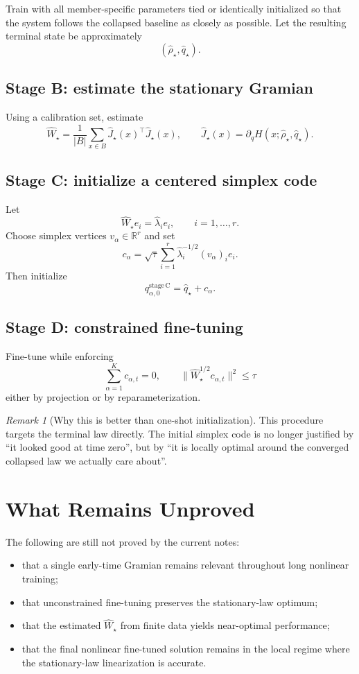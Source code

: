 \documentclass[11pt]{article}
\newcommand{\R}{\mathbb{R}}
\theoremstyle{remark}
\newtheorem{remark}[theorem]{Remark}
\begin{document}
Train with all member-specific parameters tied or identically initialized so that the system follows the collapsed baseline as closely as possible. Let the resulting terminal state be approximately
\[
(\hat\rho_\star,\hat q_\star).
\]

\subsection*{Stage B: estimate the stationary Gramian}

Using a calibration set, estimate
\[
\hat W_\star
=
\frac1{|B|}\sum_{x\in B}\hat J_\star(x)^\top \hat J_\star(x),
\qquad
\hat J_\star(x)
=
\partial_q H(x;\hat\rho_\star,\hat q_\star).
\]

\subsection*{Stage C: initialize a centered simplex code}

Let
\[
\hat W_\star e_i = \hat\lambda_i e_i,
\qquad
i=1,\dots,r.
\]
Choose simplex vertices $v_\alpha\in\R^r$ and set
\[
c_\alpha
=
\sqrt{\tau}\sum_{i=1}^r \hat\lambda_i^{-1/2}(v_\alpha)_i e_i.
\]
Then initialize
\[
q_{\alpha,0}^{\mathrm{stage\,C}}
=
\hat q_\star + c_\alpha.
\]

\subsection*{Stage D: constrained fine-tuning}

Fine-tune while enforcing
\[
\sum_{\alpha=1}^K c_{\alpha,t}=0,
\qquad
\| \hat W_\star^{1/2} c_{\alpha,t}\|^2 \le \tau
\]
either by projection or by reparameterization.

\begin{remark}[Why this is better than one-shot initialization]
This procedure targets the terminal law directly. The initial simplex code is no longer justified by ``it looked good at time zero'', but by ``it is locally optimal around the converged collapsed law we actually care about''.
\end{remark}

\section{What Remains Unproved}

The following are still not proved by the current notes:
\begin{itemize}
\item that a single early-time Gramian remains relevant throughout long nonlinear training;
\item that unconstrained fine-tuning preserves the stationary-law optimum;
\item that the estimated $\hat W_\star$ from finite data yields near-optimal performance;
\item that the final nonlinear fine-tuned solution remains in the local regime where the stationary-law linearization is accurate.
\end{itemize}
\end{document}
